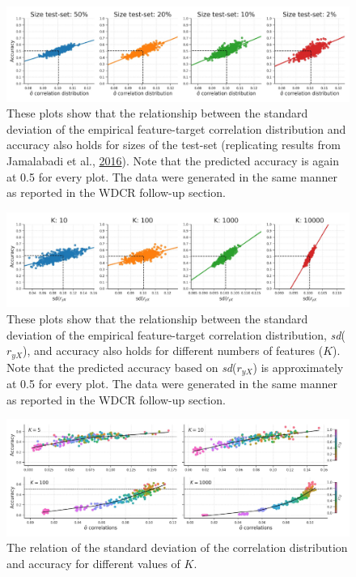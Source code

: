\documentclass[11pt,american,a4paper,oneside,]{memoir} %
\begin{document}
\begin{figure}
\centering
\includegraphics{_bookdown_files/confounds-decoding-files/figures/figure_S16.pdf}
\caption{\label{fig:fig-confounds-decoding-S16}These plots show that the relationship between the standard deviation of the empirical feature-target correlation distribution and accuracy also holds for sizes of the test-set (replicating results from Jamalabadi et al., \protect\hyperlink{ref-Jamalabadi2016-gr}{2016}). Note that the predicted accuracy is again at 0.5 for every plot. The data were generated in the same manner as reported in the WDCR follow-up section.}
\end{figure}



\begin{figure}
\centering
\includegraphics{_bookdown_files/confounds-decoding-files/figures/figure_S17.pdf}
\caption{\label{fig:fig-confounds-decoding-S17}These plots show that the relationship between the standard deviation of the empirical feature-target correlation distribution, \emph{sd}(\(r_{yX}\)), and accuracy also holds for different numbers of features (\(K\)). Note that the predicted accuracy based on \emph{sd}(\(r_{yX}\)) is approximately at 0.5 for every plot. The data were generated in the same manner as reported in the WDCR follow-up section.}
\end{figure}



\begin{figure}
\centering
\includegraphics{_bookdown_files/confounds-decoding-files/figures/figure_S18.pdf}
\caption{\label{fig:fig-confounds-decoding-S18}The relation of the standard deviation of the correlation distribution and accuracy for different values of \(K\).}
\end{figure}
\end{document}
